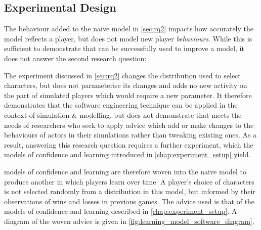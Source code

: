 \subsection{Experimental Design}

The behaviour added to the naive model in \cref{sec:rq2} impacts how accurately
the model reflects a player, but does not model new player \emph{behaviours}.
While this is sufficient to demonstrate that \aop{} can be successfully used to
improve a model, it does not answer the second research question:

\begin{researchquestion}
\rqthree{}
\end{researchquestion}


The experiment discussed in \cref{sec:rq2} changes the distribution used to
select characters, but does not parameterise its changes and adds no new
activity on the part of simulated players which would require a new parameter.
It therefore demonstrates that the software engineering technique can be applied
in the context of simulation \& modelling, but does not demonstrate that \aop
meets the needs of researchers who seek to apply advice which add or make changes to
the behaviours of actors in their simulations rather than tweaking existing
ones. As a result, answering this research question requires a further
experiment, which the \aspectoriented models of confidence and learning
introduced in \cref{chap:experiment_setup} yield.

\Aspectoriented{} models of confidence and learning are therefore woven into the naive model to
produce another in which players learn over time. A player's choice of
characters is not selected randomly from a distribution in this model, but
informed by their observations of wins and losses in previous games. The advice
used is that of the models of confidence and learning described in
\cref{chap:experiment_setup}. A diagram of the woven advice is given in
\cref{fig:learning_model_software_diagram}.

